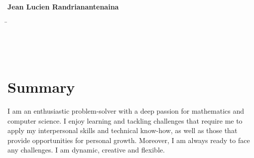 \documentclass[a4paper,10pt]{article}
\begin{document}
	\begin{minipage}[H][3cm][t]{\dimexpr\linewidth-3.1cm\relax}
		\textbf{\LARGE Jean Lucien Randrianantenaina}
		\begin{tabbing}
			\hspace{6.95cm}\=\kill
			\> \\
			\>  \\
			\> \\
			\> \\
		\end{tabbing}
	\end{minipage}\begin{minipage}[H][3cm][t]{1.5cm}
	\end{minipage}

\section{Summary}
\begin{adjustwidth}{\parindent}{\parindent}
	I am an enthusiastic problem-solver with a deep passion for mathematics and computer science. I enjoy learning and tackling challenges that require me to apply my interpersonal skills and technical know-how, as well as those that provide opportunities for personal growth. Moreover, I am always ready to face any challenges. I am dynamic, creative and flexible.
\end{adjustwidth}
\end{document}
